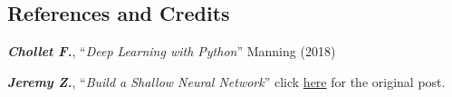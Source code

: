 \documentclass[11pt]{article}
\begin{document}
    \hypertarget{references-and-credits}{%
\subsection{References and Credits}\label{references-and-credits}}

    \textbf{\emph{Chollet F.}}, ``\emph{Deep Learning with Python}'' Manning
(2018)

    \textbf{\emph{Jeremy Z.}}, ``\emph{Build a Shallow Neural Network}''
click
\href{https://towardsdatascience.com/building-a-shallow-neural-network-a4e2728441e0}{here}
for the original post.


    
    
    
\end{document}
